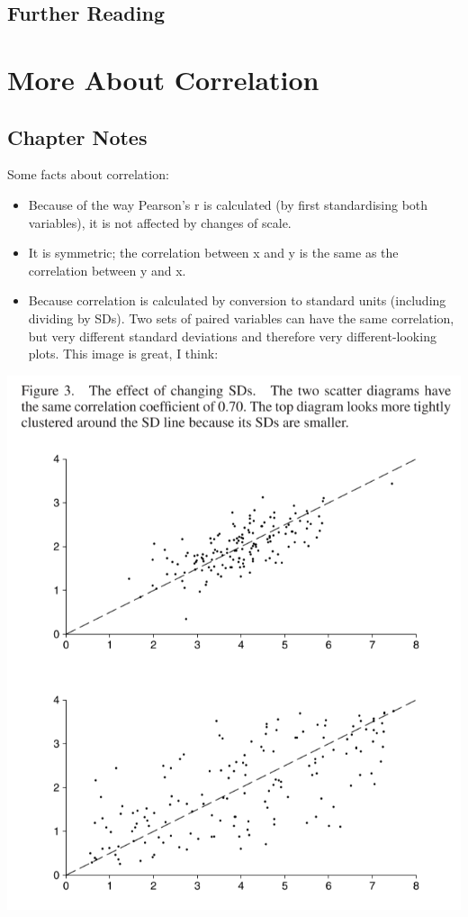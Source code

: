 \documentclass[
]{book}
\providecommand{\tightlist}{%
  \setlength{\itemsep}{0pt}\setlength{\parskip}{0pt}}
\begin{document}
\hypertarget{further-reading-7}{%
\section*{Further Reading}\label{further-reading-7}}

\hypertarget{more_correlation}{%
\chapter{More About Correlation}\label{more_correlation}}

\hypertarget{chapter-notes-8}{%
\section{Chapter Notes}\label{chapter-notes-8}}

Some facts about correlation:

\begin{itemize}
\tightlist
\item
  Because of the way Pearson's r is calculated (by first standardising both variables), it is not affected by changes of scale.
\item
  It is symmetric; the correlation between x and y is the same as the correlation between y and x.
\item
  Because correlation is calculated by conversion to standard units (including dividing by SDs). Two sets of paired variables can have the same correlation, but very different standard deviations and therefore very different-looking plots. This image is great, I think:
\end{itemize}

\includegraphics{images/Ch09Img01.png}
\end{document}
